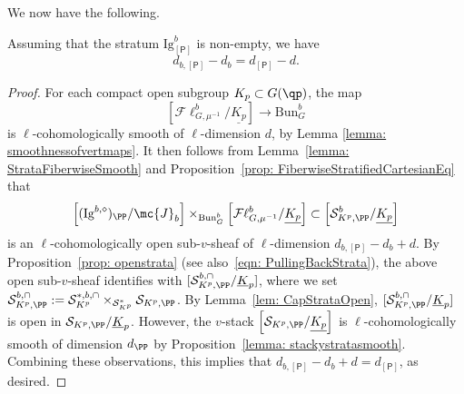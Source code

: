 \documentclass[letterpaper,11pt]{amsart}
\begin{document}
We now have the following.
\begin{proposition}\label{prop: dimensionStrataIg}
 Assuming that the stratum $\mathrm{Ig}^b_{[\mathsf{P}]}$ is non-empty, we have 
 \[
 d_{b,[\mathsf{P}]} - d_b= d_{[\mathsf{P}]} -d.
 \]
\end{proposition}
\begin{proof}
    For each compact open subgroup $K_p\subset G(\qp)$, the map 
    \[\left[\mathcal{F}\ell^b_{G,\mu^{-1}}/\underline{K_p}\right]\to \mathrm{Bun}_G^b\]
    is $\ell$-cohomologically smooth of $\ell$-dimension $d$, by Lemma \ref{lemma: smoothnessofvertmaps}. It then follows from Lemma~\ref{lemma: StrataFiberwiseSmooth} and Proposition~\ref{prop: FiberwiseStratifiedCartesianEq} that 
    \[\left[(\mathrm{Ig}^{b,\diamond})_{\PP}/\mc{J}_b\right]\times_{\mathrm{Bun}_G^b}\left[\mathcal{F}\ell^b_{G,\mu^{-1}}/\underline{K_p}\right]\subset \left[\mathcal{S}^{b}_{K^p,\PP}/\underline{K_p}\right]\]
    is an $\ell$-cohomologically open sub-$v$-sheaf of $\ell$-dimension $d_{b,[\mathsf{P}]}-d_b+d$. By Proposition~\ref{prop: openstrata} (see also~\eqref{eqn: PullingBackStrata}), the above open sub-$v$-sheaf identifies with $[\mathcal{S}_{K^p,\PP}^{b,\cap}/\underline{K}_p]$, where we set $\mathcal{S}_{K^p,\PP}^{b,\cap}:=\mathcal{S}_{K^p}^{*,b,\cap}\times_{\mathcal{S}^*_{K^p}}\mathcal{S}_{K^p,\PP}$. By Lemma~\ref{lem: CapStrataOpen}, $[\mathcal{S}_{K^p,\PP}^{b,\cap}/\underline{K}_p]$ is open in $\mathcal{S}_{K^p,\PP} / \underline{K}_p$.
     However, the $v$-stack $\left[\mathcal{S}_{K^p, \PP}/\underline{K_p}\right]$ is $\ell$-cohomologically smooth of dimension $d_{\PP}$ by Proposition~\ref{lemma: stackystratasmooth}. Combining these observations, this implies that $d_{b,[\mathsf{P}]} - d_b + d = d_{[\mathsf{P}]}$, as desired.
\end{proof}
\end{document}
